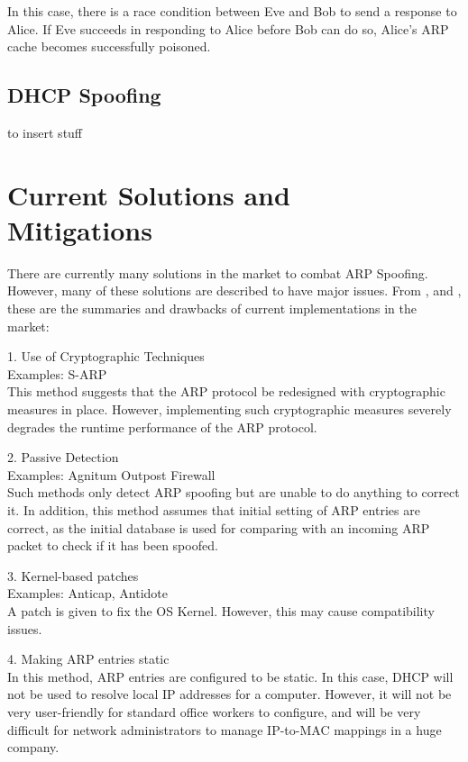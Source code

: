 \documentclass{acm_proc_article-sp}
\begin{document}
In this case, there is a race condition between Eve and Bob to send a response to Alice. If Eve succeeds in responding to Alice before Bob can do so, Alice's ARP cache becomes successfully poisoned. 

\subsection{DHCP Spoofing}
to insert stuff

\section{Current Solutions and \\Mitigations}
There are currently many solutions in the market to combat ARP Spoofing. However, many of these solutions are described to have major issues. From \cite{vivek:arp}, \cite{navid:arp2} and \cite{goldendeep:arp3},  these are the summaries and drawbacks of current implementations in the market:

1. Use of Cryptographic Techniques \\
Examples: S-ARP \\
This method suggests that the ARP protocol be redesigned with cryptographic measures in place. However, implementing such cryptographic measures severely degrades the runtime performance of the ARP protocol. 

2. Passive Detection \\
Examples: Agnitum Outpost Firewall\\
Such methods only detect ARP spoofing but are unable to do anything to correct it. In addition, this method assumes that initial setting of ARP entries are correct, as the initial database is used for comparing with an incoming ARP packet to check if it has been spoofed. 

3. Kernel-based patches\\
Examples: Anticap, Antidote \\
A patch is given to fix the OS Kernel. However, this may cause compatibility issues. 

4. Making ARP entries static\\ 
In this method, ARP entries are configured to be static. In this case, DHCP will not be used to resolve local IP addresses for a computer. However, it will not be very user-friendly for standard office workers to configure, and will be very difficult for network administrators to manage IP-to-MAC mappings in a huge company. 
\end{document}

